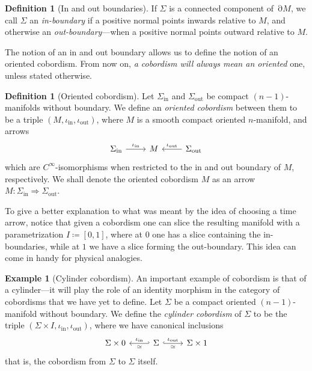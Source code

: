 \documentclass[11pt, reqno]{amsart}
\theoremstyle{definition}
\newtheorem{definition}[theorem]{Definition}
\newtheorem{example}[theorem]{Example}
\DeclareMathOperator{\Bd}{\partial}
\newcommand{\iso}{\simeq}
\newcommand{\nat}{\Rightarrow}
\begin{document}
\begin{definition}[In and out boundaries]
\label{def:in-out-boundaries}
If \(\Sigma\) is a connected component of \(\Bd M\), we call \(\Sigma\) an
\emph{in-boundary} if a positive normal points inwards relative to \(M\), and
otherwise an \emph{out-boundary}---when a positive normal points outward
relative to \(M\).
\end{definition}

The notion of an in and out boundary allows us to define the notion of an
oriented cobordism. From now on, \emph{a cobordism will always mean an oriented}
one, unless stated otherwise.

\begin{definition}[Oriented cobordism]
\label{def:oriented-cobordism}
Let \(\Sigma_{\text{in}}\) and \(\Sigma_{\text{out}}\) be compact
\((n-1)\)-manifolds without boundary. We define an \emph{oriented cobordism}
between them to be a triple \((M, \iota_{\text{in}}, \iota_{\text{out}})\),
where \(M\) is a smooth compact oriented \(n\)-manifold, and arrows
\[
\begin{tikzcd}
\Sigma_{\text{in}} \ar[r, "\iota_{\text{in}}"] &M
&\Sigma_{\text{out}} \ar[l, "\iota_{\text{out}}"']
\end{tikzcd}
\]
which are \(C^{\infty}\)-isomorphisms when restricted to the in and out boundary
of \(M\), respectively. We shall denote the oriented cobordism \(M\) as an
arrow \(M: \Sigma_{\text{in}} \nat \Sigma_{\text{out}}\).
\end{definition}

To give a better explanation to what was meant by the idea of choosing a time
arrow, notice that given a cobordism one can slice the resulting manifold with a
parametrization \(I \coloneq [0, 1]\), where at \(0\) one has a slice containing
the in-boundaries, while at \(1\) we have a slice forming the out-boundary. This
idea can come in handy for physical analogies.

\begin{example}[Cylinder cobordism]
\label{exp:cylinder-cobordism}
An important example of cobordism is that of a cylinder---it will play the role
of an identity morphism in the category of cobordisms that we have yet to
define. Let \(\Sigma\) be a compact oriented \((n-1)\)-manifold without
boundary. We define the \emph{cylinder cobordism} of \(\Sigma\) to be the triple
\((\Sigma \times I, \iota_{\text{in}}, \iota_{\text{out}})\), where we have
canonical inclusions
\[
\begin{tikzcd}
\Sigma \times 0
&\Sigma
\ar[l, "\iota_{\text{in}}"', "\iso", hook']
\ar[r, "\iota_{\text{out}}", "\iso"', hook]
&\Sigma \times 1
\end{tikzcd}
\]
that is, the cobordism from \(\Sigma\) to \(\Sigma\) itself.
\end{example}
\end{document}
